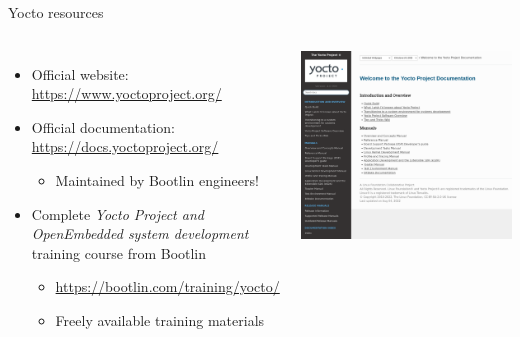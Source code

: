\begin{frame}{Yocto resources}
  \begin{columns}
    \begin{itemize}
    \item Official website: \url{https://www.yoctoproject.org/}
    \item Official documentation: \url{https://docs.yoctoproject.org/}
      \begin{itemize}
      \item Maintained by Bootlin engineers!
      \end{itemize}
    \item Complete {\em Yocto Project and OpenEmbedded system
        development} training course from Bootlin
      \begin{itemize}
      \item \url{https://bootlin.com/training/yocto/}
      \item Freely available training materials
      \end{itemize}
    \end{itemize}
    \begin{center}
      \includegraphics[height=0.4\textheight]{slides/sysdev-build-systems/yp-docs.png}\\

\end{center}
\end{columns}
\end{frame}
